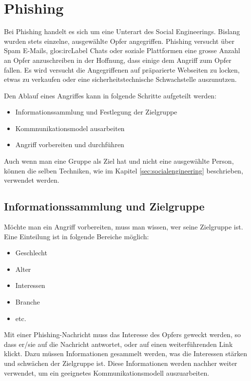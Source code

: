 \setcounter{secnumdepth}{3}
\chapter{Phishing}
Bei Phishing handelt es sich um eine Unterart des Social Engineerings. Bislang wurden stets einzelne, ausgewählte Opfer angegriffen.
Phishing versucht über Spam E-Mails, \Gls{glos:ircLabel} Chats oder soziale Plattformen eine grosse Anzahl an Opfer anzuschreiben in der Hoffnung, dass einige dem Angriff zum Opfer fallen. Es wird versucht die Angegriffenen auf präparierte Webseiten zu locken, etwas zu verkaufen oder eine sicherheitstechnische Schwachstelle auszunutzen.

Den Ablauf eines Angriffes kann in folgende Schritte aufgeteilt werden:
\begin{itemize}
\item Informationssammlung und Festlegung der Zielgruppe
\item Kommnunikationsmodel ausarbeiten
\item Angriff vorbereiten und durchführen
\end{itemize}

Auch wenn man eine Gruppe als Ziel hat und nicht eine ausgewählte Person, können die selben Techniken, wie im Kapitel \ref{sec:socialengineering}  beschrieben, verwendet werden.

\section{Informationssammlung und Zielgruppe}
Möchte man ein Angriff vorbereiten, muss man wissen, wer seine Zielgruppe ist. Eine Einteilung ist in folgende Bereiche möglich:
\begin{itemize}
\item Geschlecht
\item Alter
\item Interessen
\item Branche
\item etc.
\end{itemize}

Mit einer Phishing-Nachricht muss das Interesse des Opfers geweckt werden, so dass er/sie auf die Nachricht antwortet, oder auf einen weiterführenden Link klickt. Dazu müssen Informationen gesammelt werden, was die Interessen stärken und schwächen der Zielgruppe ist. Diese Informationen werden nachher weiter verwendet, um ein geeignetes Kommunikationsmodell auszuarbeiten.

